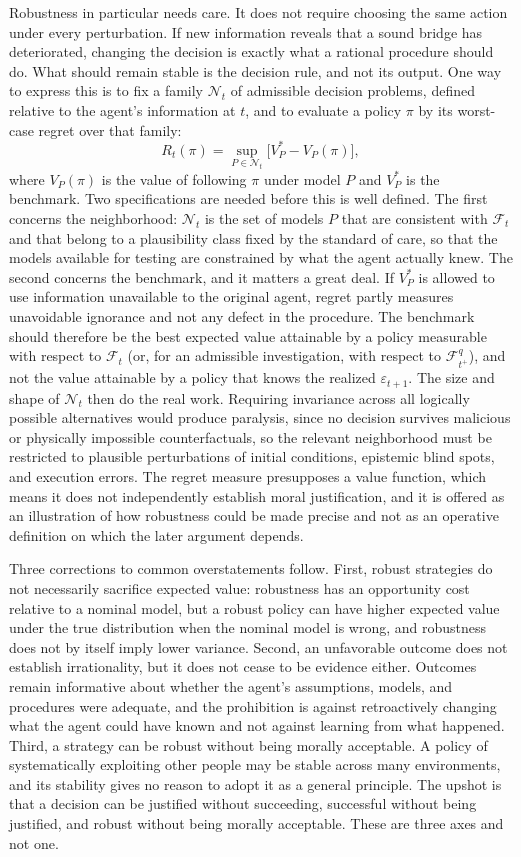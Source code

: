 \documentclass[11pt]{article}
\newcommand{\F}{\mathcal F}
\theoremstyle{definition}
\begin{document}
Robustness in particular needs care. It does not require choosing the same action under every perturbation. If new information reveals that a sound bridge has deteriorated, changing the decision is exactly what a rational procedure should do. What should remain stable is the decision rule, and not its output. One way to express this is to fix a family $\mathcal N_t$ of admissible decision problems, defined relative to the agent's information at $t$, and to evaluate a policy $\pi$ by its worst-case regret over that family:
\[
R_t(\pi)=\sup_{P\in\mathcal N_t}\bigl[V^{*}_{P}-V_{P}(\pi)\bigr],
\]
where $V_{P}(\pi)$ is the value of following $\pi$ under model $P$ and $V^{*}_{P}$ is the benchmark. Two specifications are needed before this is well defined. The first concerns the neighborhood: $\mathcal N_t$ is the set of models $P$ that are consistent with $\F_t$ and that belong to a plausibility class fixed by the standard of care, so that the models available for testing are constrained by what the agent actually knew. The second concerns the benchmark, and it matters a great deal. If $V^{*}_{P}$ is allowed to use information unavailable to the original agent, regret partly measures unavoidable ignorance and not any defect in the procedure. The benchmark should therefore be the best expected value attainable by a policy measurable with respect to $\F_t$ (or, for an admissible investigation, with respect to $\F_{t^{+}}^{q}$), and not the value attainable by a policy that knows the realized $\varepsilon_{t+1}$. The size and shape of $\mathcal N_t$ then do the real work. Requiring invariance across all logically possible alternatives would produce paralysis, since no decision survives malicious or physically impossible counterfactuals, so the relevant neighborhood must be restricted to plausible perturbations of initial conditions, epistemic blind spots, and execution errors. The regret measure presupposes a value function, which means it does not independently establish moral justification, and it is offered as an illustration of how robustness could be made precise and not as an operative definition on which the later argument depends.

Three corrections to common overstatements follow. First, robust strategies do not necessarily sacrifice expected value: robustness has an opportunity cost relative to a nominal model, but a robust policy can have higher expected value under the true distribution when the nominal model is wrong, and robustness does not by itself imply lower variance. Second, an unfavorable outcome does not establish irrationality, but it does not cease to be evidence either. Outcomes remain informative about whether the agent's assumptions, models, and procedures were adequate, and the prohibition is against retroactively changing what the agent could have known and not against learning from what happened. Third, a strategy can be robust without being morally acceptable. A policy of systematically exploiting other people may be stable across many environments, and its stability gives no reason to adopt it as a general principle. The upshot is that a decision can be justified without succeeding, successful without being justified, and robust without being morally acceptable. These are three axes and not one.
\end{document}
